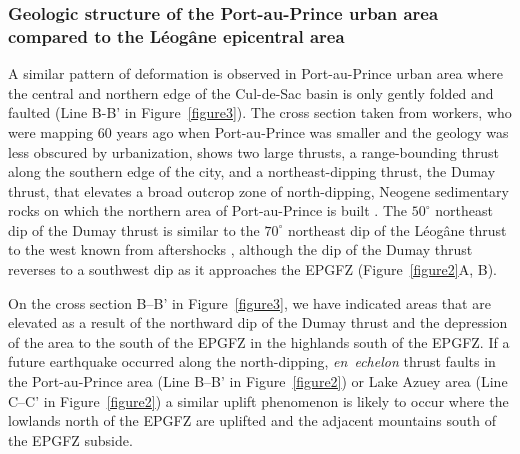 \documentclass[linenumbers,draft]{agujournal}
\begin{document}
\subsubsection{Geologic structure of the Port-au-Prince urban area compared to the L\'eog\^ane epicentral area} 
A similar pattern of deformation is observed in Port-au-Prince urban area where the central and northern edge of the Cul-de-Sac basin is only gently folded and faulted \citep{massoni1955haiti,cox2011shear,mchugh2011offshore,saint2015seismotectonics} (Line B-B' in Figure~\ref{figure3}). The cross section taken from workers, who were mapping 60 years ago when Port-au-Prince was smaller and the geology was less obscured by urbanization, shows two large thrusts, a range-bounding thrust along the southern edge of the city, and a northeast-dipping thrust, the Dumay thrust, that elevates a broad outcrop zone of north-dipping, Neogene sedimentary rocks on which the northern area of Port-au-Prince is built \citep{rathje2014geotechnical}. The $50^{\circ}$ northeast dip of the Dumay thrust is similar to the $70^{\circ}$ northeast dip of the L\'eog\^ane thrust to the west known from aftershocks \citep{douilly2013crustal,douilly2015three}, although the dip of the Dumay thrust reverses to a southwest dip as it approaches the EPGFZ (Figure~\ref{figure2}A, B). 

On the cross section B--B' in Figure~\ref{figure3}, we have indicated areas that are elevated as a result of the northward dip of the Dumay thrust and the depression of the area to the south of the EPGFZ in the highlands south of the EPGFZ. If a future earthquake occurred along the north-dipping, \textit{en~echelon} thrust faults in the Port-au-Prince area (Line B--B' in Figure~\ref{figure2}) or Lake Azuey area (Line C--C' in Figure~\ref{figure2}) a similar uplift phenomenon is likely to occur where the lowlands north of the EPGFZ are uplifted and the adjacent mountains south of the EPGFZ subside.
\end{document}
